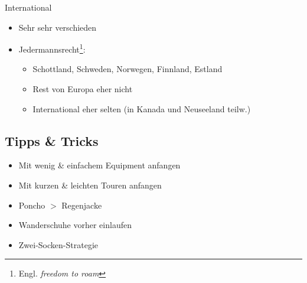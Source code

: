 \documentclass[aspectratio=169]{beamer}
\begin{document}
			\begin{frame}{International}
				\begin{itemize}
					\item Sehr sehr verschieden
					\item Jedermannsrecht\footnote{Engl. \textit{freedom to roam}}:
					\begin{itemize}
						\item Schottland, Schweden, Norwegen, Finnland, Estland
						\item Rest von Europa eher nicht
						\item International eher selten (in Kanada und Neuseeland teilw.)
					\end{itemize}
				\end{itemize}
			\end{frame}
%		
		\subsection{Tipps \& Tricks}
		
			\begin{frame}{}
				\begin{itemize}
					\item Mit wenig \& einfachem Equipment anfangen
					\item Mit kurzen \& leichten Touren anfangen
					\item Poncho $>$ Regenjacke
					\item Wanderschuhe vorher einlaufen
					\item Zwei-Socken-Strategie
				\end{itemize}
			\end{frame}
		
		{
			\frame{}
		}
\end{document}
